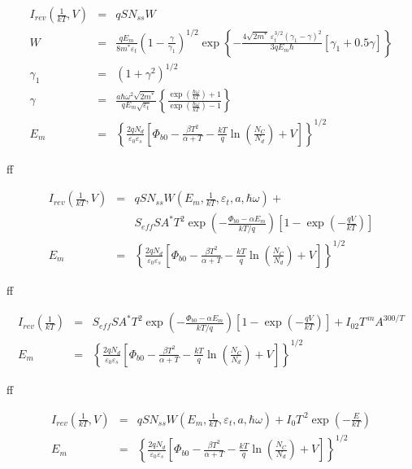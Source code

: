 \documentclass[14pt]{article}
\numberwithin{equation}{part}
\begin{document}
\begin{eqnarray*}
    I_{rev}\left(\frac{1}{kT}, V\right)&=&qSN_{ss}W \\
    W&=&\frac{qE_m}{8m^*\varepsilon_t}\left(1-\frac{\gamma}{\gamma_1}\right)^{1/2}\exp
    \left\{-\frac{4\sqrt{2m^*}\,\varepsilon_t^{3/2}\left(\gamma_1-\gamma\right)^2}{3qE_m\hbar}
    [\gamma_1+0.5\gamma]\right\}\\
    \gamma_1&=&(1+\gamma^2)^{1/2}\\
    \gamma&=&\frac{a\hbar\omega^2\sqrt{2m^*}}{qE_m\sqrt{\varepsilon_t}}
    \left\{\frac{\exp\left(\frac{\hbar\omega}{kT}\right)+1}{\exp\left(\frac{\hbar\omega}{kT}\right)-1}\right\}\\
    E_m&=&\left\{\frac{2qN_d}{\varepsilon_0\varepsilon_s}\left[\Phi_{b0}-\frac{\beta T^2}{\alpha+T}-\frac{kT}{q}\ln\left(\frac{N_C}{N_d}\right)+V\right]\right\}^{1/2}
\end{eqnarray*}

ff

\begin{eqnarray*}
    I_{rev}\left(\frac{1}{kT}, V\right)&=&qSN_{ss}W\left(E_m,\frac{1}{kT},\varepsilon_t,a,\hbar\omega\right)+\\
    &&S_{eff}SA^*T^2\exp\left(-\frac{\Phi_{b0}-\alpha E_m}{kT/q}\right)\left[1-\exp\left(-\frac{qV}{kT}\right)\right]\\
    E_m&=&\left\{\frac{2qN_d}{\varepsilon_0\varepsilon_s}\left[\Phi_{b0}-\frac{\beta T^2}{\alpha+T}-\frac{kT}{q}\ln\left(\frac{N_C}{N_d}\right)+V\right]\right\}^{1/2}
\end{eqnarray*}

ff

\begin{eqnarray*}
    I_{rev}\left(\frac{1}{kT}\right)&=&S_{eff}SA^*T^2\exp\left(-\frac{\Phi_{b0}-\alpha E_m}{kT/q}\right)\left[1-\exp\left(-\frac{qV}{kT}\right)\right]+I_{02}T^{\,m}A^{300/T}\\
    E_m&=&\left\{\frac{2qN_d}{\varepsilon_0\varepsilon_s}\left[\Phi_{b0}-\frac{\beta T^2}{\alpha+T}-\frac{kT}{q}\ln\left(\frac{N_C}{N_d}\right)+V\right]\right\}^{1/2}
\end{eqnarray*}

ff

\begin{eqnarray*}
    I_{rev}\left(\frac{1}{kT}, V\right)&=&qSN_{ss}W\left(E_m,\frac{1}{kT},\varepsilon_t,a,\hbar\omega\right)+
    I_{0}T^{\,2}\exp\left(-\frac{E}{kT}\right)\\
    E_m&=&\left\{\frac{2qN_d}{\varepsilon_0\varepsilon_s}\left[\Phi_{b0}-\frac{\beta T^2}{\alpha+T}-\frac{kT}{q}\ln\left(\frac{N_C}{N_d}\right)+V\right]\right\}^{1/2}
\end{eqnarray*}
\end{document}
